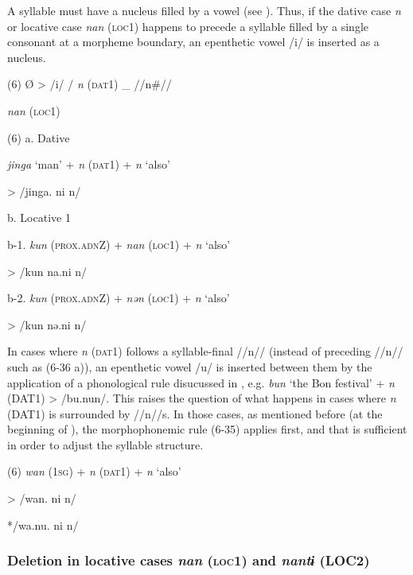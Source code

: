 A syllable must have a nucleus filled by a vowel (see ). Thus, if the dative case \textit{n} or locative case \textit{nan} (\textsc{loc}1) happens to precede a syllable filled by a single consonant at a morpheme boundary, an epenthetic vowel /i/ is inserted as a nucleus.

(6)  Ø  >  /i/  /  %
  \textit{n}  %
(\textsc{dat}1)    \_  //n\#//

            \textit{nan}  (\textsc{loc}1)

(6)  a.  Dative

    \textit{jinga}  ‘man’  +  \textit{n}  (\textsc{dat}1)  +  \textit{n}  ‘also’

  >  /jinga.      ni      n/  

  b.  Locative 1

  b-1.  \textit{kun}  (\textsc{prox}.\textsc{adn}Z)  +  \textit{nan}  (\textsc{loc}1)  +  \textit{n}  ‘also’

  >  /kun      na.ni      n/  

  b-2.  \textit{kun}  (\textsc{prox}.\textsc{adn}Z)  +  \textit{nən}  (\textsc{loc}1)  +  \textit{n}  ‘also’

  >  /kun      nə.ni      n/  

In cases where \textit{n} (\textsc{dat}1) follows a syllable-final //n// (instead of preceding //n// such as (6-36 a)), an epenthetic vowel /u/ is inserted between them by the application of a phonological rule disucussed in , e.g. \textit{bun} ‘the Bon festival’ + \textit{n} (DAT1) > /bu.nun/. This raises the question of what happens in cases where \textit{n} (DAT1) is surrounded by //n//s. In those cases, as mentioned before (at the beginning of ), the morphophonemic rule (6-35) applies first, and that is sufficient in order to adjust the syllable structure.

(6)    \textit{wan}  (1\textsc{sg})  +  \textit{n}  (\textsc{dat}1)  +  \textit{n}  ‘also’

  >  /wan.      ni      n/  

    */wa.nu.      ni      n/  

\subsubsection{Deletion in locative cases \textit{nan} (\textsc{loc}1) and \textit{nantɨ} (LOC2)}

